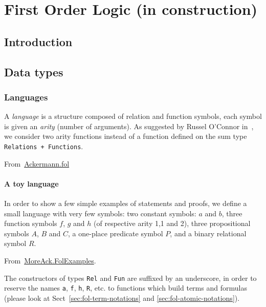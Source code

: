 \chapter{First Order Logic (in construction)}
\label{chap:fol}

\section{Introduction}

\section{Data types}

\subsection{Languages}

A \emph{language} is a structure composed of relation and function symbols, each symbol is given an \emph{arity} (number of arguments). As suggested by Russel O'Connor in~\cite{OConnor05}, we consider two arity functions instead of a function defined on the sum type \texttt{Relations + Functions}.

From~\href{../theories/html/hydras.Ackermann.fol.html}{Ackermann.fol}


\subsubsection{A toy language}
In order to show a few simple examples of statements and proofs, we define a small language with very few symbols:
two constant symbols: $a$ and $b$, three function symbols $f$, $g$ and $h$  (of respective arity 1,1 and 2), three propositional symbols $A$, $B$ and $C$, a one-place predicate symbol $P$, and a binary relational symbol $R$. 
 
From~\href{../theories/html/hydras.MoreAck.FolExamples.html}{MoreAck.FolExamples}.


\begin{remark}
  The constructors of types \texttt{Rel} and \texttt{Fun} are suffixed by an underscore, in order to reserve the names \texttt{a}, \texttt{f}, \texttt{h}, \texttt{R}, etc. to functions which build terms and formulas (please look at Sect~\ref{sec:fol-term-notations} and \ref{sec:fol-atomic-notations}).
\end{remark}


